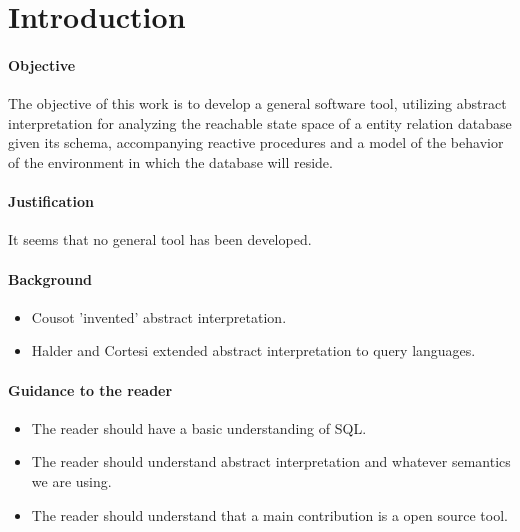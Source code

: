 
\section{Introduction}\label{sec:introduction}


\paragraph{Objective}

The objective of this work is to develop a general software tool, utilizing abstract interpretation for analyzing the reachable state space of a entity relation database given its schema, accompanying reactive procedures and a model of the behavior of the environment in which the database will reside.


\paragraph{Justification}

It seems that no general tool has been developed.

\paragraph{Background}

\begin{itemize}
    \item Cousot 'invented' abstract interpretation.
    \item Halder and Cortesi extended abstract interpretation to query languages.
\end{itemize}

\paragraph{Guidance to the reader}

\begin{itemize}
    \item The reader should have a basic understanding of SQL.
    \item The reader should understand abstract interpretation and whatever semantics we are using.
    \item The reader should understand that a main contribution is a open source tool.
\end{itemize}

